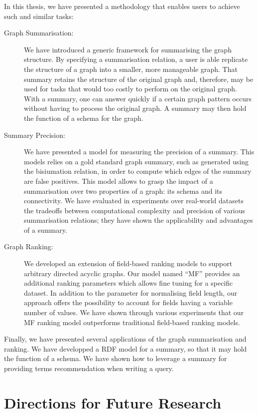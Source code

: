 In this thesis, we have presented a methodology that enables users to achieve such and similar tasks:
\begin{description}
	\item[Graph Summarisation:] We have introduced a generic framework for summarising the graph structure. By specifying a summarisation relation, a user is able replicate the structure of a graph into a smaller, more manageable graph. That summary retains the structure of the original graph and, therefore, may be used for tasks that would too costly to perform on the original graph. With a summary, one can answer quickly if a certain graph pattern occurs without having to process the original graph. A summary may then hold the function of a schema for the graph.
	\item[Summary Precision:] We have presented a model for measuring the precision of a summary. This models relies on a gold standard graph summary, such as generated using the bisiumation relation, in order to compute which edges of the summary are false positives. This model allows to grasp the impact of a summarisation over two properties of a graph: its schema and its connectivity. We have evaluated in experiments over real-world datasets the tradeoffs between computational complexity and precision of various summarisation relations; they have shown the applicability and advantages of a summary.
	\item[Graph Ranking:] We developed an extension of field-based ranking models to support arbitrary directed acyclic graphs. Our model named ``MF'' provides an additional ranking parameters which allows fine tuning for a specific dataset. In addition to the parameter for normalising field length, our approach offers the possibility to account for fields having a variable number of values. We have shown through various experiments that our MF ranking model outperforms traditional field-based ranking models.
\end{description}
Finally, we have presented several applications of the graph summarisation and ranking. We have developped a RDF model for a summary, so that it may hold the function of a schema. We have shown how to leverage a summary for providing terms recommendation when writing a query.

\section{Directions for Future Research}

